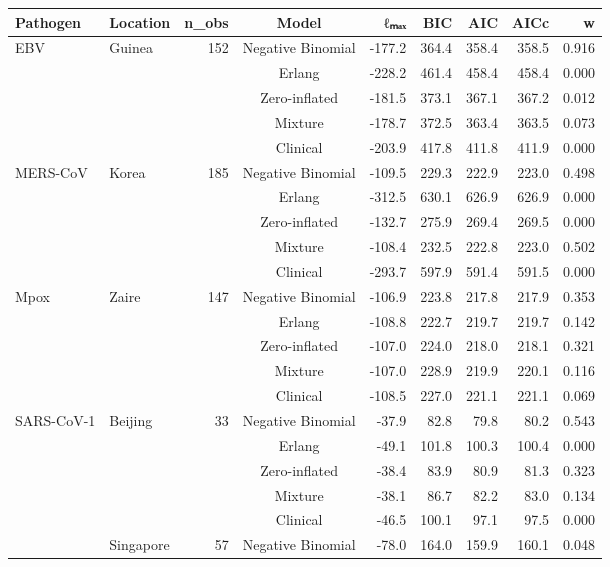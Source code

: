 \begin{table}[ht]
\centering
\begin{tabular}{llrcrrrrr}
  \hline
Pathogen & Location & n_obs & Model & ℓₘₐₓ & BIC & AIC & AICc & w \\ 
  \hline
EBV & Guinea & 152 & Negative Binomial & -177.2 & 364.4 & 358.4 & 358.5 & 0.916 \\ 
   &  &  & Erlang & -228.2 & 461.4 & 458.4 & 458.4 & 0.000 \\ 
   &  &  & Zero-inflated & -181.5 & 373.1 & 367.1 & 367.2 & 0.012 \\ 
   &  &  & Mixture & -178.7 & 372.5 & 363.4 & 363.5 & 0.073 \\ 
   &  &  & Clinical & -203.9 & 417.8 & 411.8 & 411.9 & 0.000 \\ 
  MERS-CoV & Korea & 185 & Negative Binomial & -109.5 & 229.3 & 222.9 & 223.0 & 0.498 \\ 
   &  &  & Erlang & -312.5 & 630.1 & 626.9 & 626.9 & 0.000 \\ 
   &  &  & Zero-inflated & -132.7 & 275.9 & 269.4 & 269.5 & 0.000 \\ 
   &  &  & Mixture & -108.4 & 232.5 & 222.8 & 223.0 & 0.502 \\ 
   &  &  & Clinical & -293.7 & 597.9 & 591.4 & 591.5 & 0.000 \\ 
  Mpox & Zaire & 147 & Negative Binomial & -106.9 & 223.8 & 217.8 & 217.9 & 0.353 \\ 
   &  &  & Erlang & -108.8 & 222.7 & 219.7 & 219.7 & 0.142 \\ 
   &  &  & Zero-inflated & -107.0 & 224.0 & 218.0 & 218.1 & 0.321 \\ 
   &  &  & Mixture & -107.0 & 228.9 & 219.9 & 220.1 & 0.116 \\ 
   &  &  & Clinical & -108.5 & 227.0 & 221.1 & 221.1 & 0.069 \\ 
  SARS-CoV-1 & Beijing & 33 & Negative Binomial & -37.9 & 82.8 & 79.8 & 80.2 & 0.543 \\ 
   &  &  & Erlang & -49.1 & 101.8 & 100.3 & 100.4 & 0.000 \\ 
   &  &  & Zero-inflated & -38.4 & 83.9 & 80.9 & 81.3 & 0.323 \\ 
   &  &  & Mixture & -38.1 & 86.7 & 82.2 & 83.0 & 0.134 \\ 
   &  &  & Clinical & -46.5 & 100.1 & 97.1 & 97.5 & 0.000 \\ 
   & Singapore & 57 & Negative Binomial & -78.0 & 164.0 & 159.9 & 160.1 & 0.048 \\ 

\end{tabular}
\end{table}
